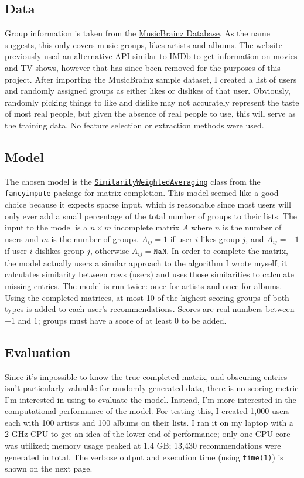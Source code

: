 \documentclass[12pt]{article}
\begin{document}
	\subsection*{Data}
	Group information is taken from the \href{https://musicbrainz.org/doc/MusicBrainz_Database/}{MusicBrainz Database}. As the name suggests, this only covers music groups, likes artists and albums. The website previously used an alternative API similar to IMDb to get information on movies and TV shows, however that has since been removed for the purposes of this project. After importing the MusicBrainz sample dataset, I created a list of users and randomly assigned groups as either likes or dislikes of that user. Obviously, randomly picking things to like and dislike may not accurately represent the taste of most real people, but given the absence of real people to use, this will serve as the training data. No feature selection or extraction methods were used.

	\subsection*{Model}
	The chosen model is the \href{https://github.com/iskandr/fancyimpute/blob/master/fancyimpute/similarity_weighted_averaging.py}{\tt SimilarityWeightedAveraging} class from the {\tt fancyimpute} package for matrix completion. This model seemed like a good choice because it expects sparse input, which is reasonable since most users will only ever add a small percentage of the total number of groups to their lists. The input to the model is a $n \times m$ incomplete matrix $A$ where $n$ is the number of users and $m$ is the number of groups. $A_{ij}=1$ if user $i$ likes group $j$, and $A_{ij}=-1$ if user $i$ dislikes group $j$, otherwise $A_{ij}=\mathtt{NaN}$. In order to complete the matrix, the model actually users a similar approach to the algorithm I wrote myself; it calculates similarity between rows (users) and uses those similarities to calculate missing entries. The model is run twice: once for artists and once for albums. Using the completed matrices, at most 10 of the highest scoring groups of both types is added to each user's recommendations. Scores are real numbers between $-1$ and $1$; groups must have a score of at least 0 to be added.

	\subsection*{Evaluation}
	Since it's impossible to know the true completed matrix, and obscuring entries isn't particularly valuable for randomly generated data, there is no scoring metric I'm interested in using to evaluate the model. Instead, I'm more interested in the computational performance of the model. For testing this, I created 1,000 users each with 100 artists and 100 albums on their lists. I ran it on my laptop with a 2 GHz CPU to get an idea of the lower end of performance; only one CPU core was utilized; memory usage peaked at 1.4 GB; 13,430 recommendations were generated in total. The verbose output and execution time (using {\tt time(1)}) is shown on the next page.
\end{document}
